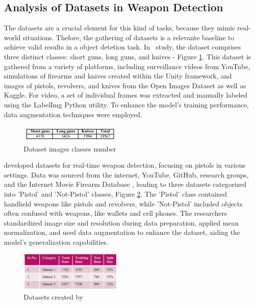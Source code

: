 \subsection{Analysis of Datasets in Weapon Detection}
The datasets are a crucial element for this kind of tasks, because they mimic real-world situations. Thefore, the 
gathering of datasets is a relevante baseline to achieve valid results in a object detetion task.
In~\citet{rfc3} study, the dataset comprises three distinct classes: short guns, long guns, and knives - Figure \ref{fig:rehman-dataset}. This dataset is gathered from a variety of platforms, including surveillance videos from YouTube, simulations of firearms and knives created within the Unity framework, and images of pistols, revolvers, and knives from the Open Images Dataset as well as Kaggle. For video, a set of individual frames was extracted and manually labeled using the LabelImg Python utility. To enhance the model's training performance, data augmentation techniques were employed.

\begin{figure}[h]
    \centering 
    \includegraphics[width=0.45\textwidth]{figs/rheman-dataset.png} 
    \caption{Dataset images classes number~\cite{rfc3} }
    \label{fig:rehman-dataset}
\end{figure}

\citet{rfc4} developed datasets for real-time weapon detection, focusing on pistols in various settings. Data was sourced from the internet, YouTube, GitHub, research groups, and the Internet Movie Firearm Database \cite{rfc28}, leading to three datasets categorized into 'Pistol' and 'Not-Pistol' classes, Figure \ref{fig:bathi-dataset}. The 'Pistol' class contained handheld weapons like pistols and revolvers, while 'Not-Pistol' included objects often confused with weapons, like wallets and cell phones. The researchers standardized image size and resolution during data preparation, applied mean normalization, and used data augmentation to enhance the dataset, aiding the model's generalization capabilities.
\begin{figure}[h]
    \centering 
    \includegraphics[width=0.45\textwidth]{figs/bathi-dataset.png} 
    \caption{Datasets created by~\cite{rfc4}}
    \label{fig:bathi-dataset}
\end{figure}

